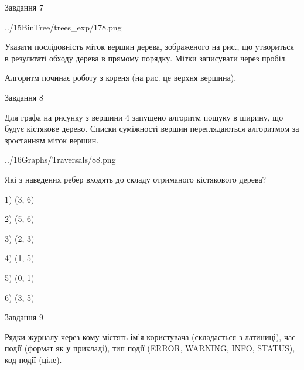 \documentclass[12pt, ukrainian]{article}
\begin{document}
{\vspace{10mm}\par

\newpage
\begin{minipage}[t]{9.7cm}
               
{\begin{center}Завдання {7}\end{center}}
\vspace{-4mm}

\begin{center}
	{../15BinTree/trees_exp/178.png}
\end{center}
Указати послідовність міток вершин дерева, зображеного на рис., що утвориться в результаті обходу дерева в прямому порядку. Мітки записувати через пробіл.\par Алгоритм починає роботу з кореня (на рис. це верхня вершина).\par

\end{minipage}
\vline \hspace{8mm}
\begin{minipage}[t]{8.0cm}
               
{\begin{center}Завдання {8}\end{center}}
\vspace{-4mm}
Для графа на рисунку з вершини 4 запущено алгоритм пошуку в ширину, що будує кістякове дерево. Списки суміжності вершин переглядаються алгоритмом за зростанням міток вершин.\par
\begin{center}
	{../16Graphs/Traversals/88.png}
\end{center}
\par Які з наведених ребер входять до складу отриманого кістякового дерева?\par
1) (3, 6)\par
2) (5, 6)\par
3) (2, 3)\par
4) (1, 5)\par
5) (0, 1)\par
6) (3, 5)\par
{\vskip 15pt} \par

\end{minipage}

               
{\begin{center}Завдання {9}\end{center}}
\vspace{-4mm}
Рядки журналу через кому містять ім'я користувача (складається з латиниці), час події (фор\-мат як у прикладі), тип події (ERROR, WARNING, INFO, STATUS), код події (ціле).

}
\end{document}
